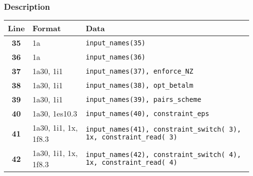 \documentclass[a4paper,11pt]{article}
\begin{document}
\subsubsection*{Description}
\begin{center}
\begin{tabular}{|c|l|l|}
\hline
Line & Format & Data \\
\hline
 \textbf{35}   & 1a            & \tt input\_names(35)                  \\
 \textbf{36}   & 1a            & \tt input\_names(36)                  \\
 \textbf{37}   & 1a30, 1i1     & \tt input\_names(37), enforce\_NZ     \\
 \textbf{38}   & 1a30, 1i1     & \tt input\_names(38), opt\_betalm     \\
 \textbf{39}   & 1a30, 1i1     & \tt input\_names(39), pairs\_scheme   \\
 \textbf{40}   & 1a30, 1es10.3 & \tt input\_names(40), constraint\_eps \\
 \textbf{41}   & 1a30, 1i1, 1x, 1f8.3 & \tt input\_names(41), constraint\_switch( 3), 1x, constraint\_read( 3) \\
 \textbf{42}   & 1a30, 1i1, 1x, 1f8.3 & \tt input\_names(42), constraint\_switch( 4), 1x, constraint\_read( 4) \\

\end{tabular}
\end{center}
\end{document}
